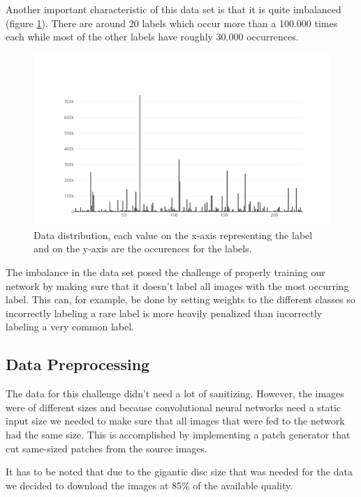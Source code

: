 \documentclass[10pt, a4paper]{article}
\begin{document}
\begin{multicols}{2}
		Another important characteristic of this data set is that it is quite imbalanced (figure \ref{fig:data_dist}). There are around 20 labels which occur more than a 100.000 times each while most of the other labels have roughly 30.000 occurrences.
		\\
		\begin{figure}[H]
            \centering
            \includegraphics[scale=.4]{img/data_distribution.png}
            \caption{Data distribution, each value on the x-axis representing the label and on the y-axis are the occurences for the labels.}
            \label{fig:data_dist}
        \end{figure}
        The imbalance in the data set posed the challenge of properly training our network by making sure that it doesn't label all images with the most occurring label. This can, for example, be done by setting weights to the different classes so incorrectly labeling a rare label is more heavily penalized than incorrectly labeling a very common label.
	
		\subsection*{Data Preprocessing}
		The data for this challenge didn't need a lot of sanitizing. However, the images were of different sizes and because convolutional neural networks need a static input size we needed to make sure that all images that were fed to the network had the same size. This is accomplished by implementing a patch generator that cut same-sized patches from the source images. 
		
		It has to be noted that due to the gigantic disc size that was needed for the data we decided to download the images at 85\% of the available quality.
		

\end{multicols}
\end{document}
